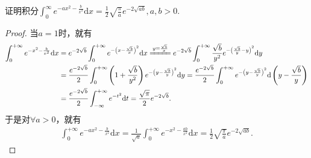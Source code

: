 \documentclass[../../main.tex]{subfiles}%
\begin{document}
\begin{example}\label{example:常用定积分公式}
证明积分$\int_{0}^{\infty}e^{-ax^{2}-\frac{b}{x^{2}}}\mathrm{d}x=\frac{1}{2}\sqrt{\frac{\pi}{a}}e^{-2\sqrt{ab}},a,b>0.$
\end{example}
\begin{proof}

当\(a=1\)时，就有
\begin{align*}
\int_0^{+\infty}{e^{-x^2-\frac{b}{x^2}}\mathrm{d}x}&=e^{-2\sqrt{b}}\int_0^{+\infty}{e^{-\left( x-\frac{\sqrt{b}}{x} \right) ^2}\mathrm{d}x}\xlongequal{y=\frac{\sqrt{b}}{x}}e^{-2\sqrt{b}}\int_0^{+\infty}{\frac{\sqrt{b}}{y^2}e^{-\left( \frac{\sqrt{b}}{y}-y \right) ^2}\mathrm{d}y}\nonumber\\
&=\frac{e^{-2\sqrt{b}}}{2}\int_0^{+\infty}{\left( 1+\frac{\sqrt{b}}{y^2} \right) e^{-\left( y-\frac{\sqrt{b}}{y} \right) ^2}\mathrm{d}y}=\frac{e^{-2\sqrt{b}}}{2}\int_0^{+\infty}{e^{-\left( y-\frac{\sqrt{b}}{y} \right) ^2}\mathrm{d}\left( y-\frac{\sqrt{b}}{y} \right)}\nonumber\\
&=\frac{e^{-2\sqrt{b}}}{2}\int_{-\infty}^{+\infty}{e^{-t^2}\mathrm{d}t}=\frac{\sqrt{\pi}}{2}e^{-2\sqrt{b}}.
\end{align*}
于是对\(\forall a>0\)，就有
\begin{align*}
\int_0^{+\infty}{e^{-ax^2-\frac{b}{x^2}}\mathrm{d}x}=\frac{1}{\sqrt{a}}\int_0^{+\infty}{e^{-x^2-\frac{ab}{x^2}}\mathrm{d}x}=\frac{1}{2}\sqrt{\frac{\pi}{a}}e^{-2\sqrt{ab}}.
\end{align*}

\end{proof}
\end{document}
